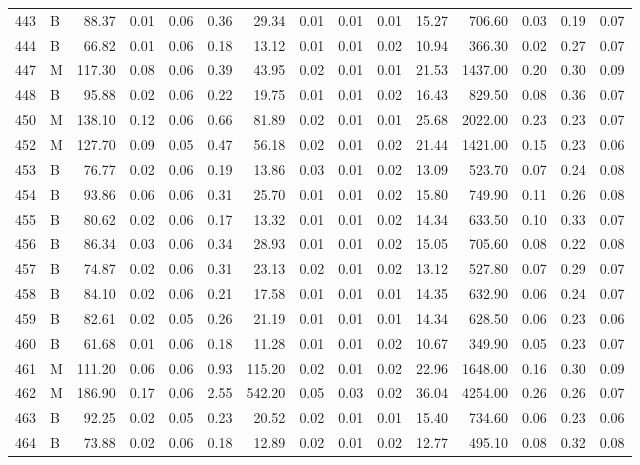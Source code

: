 \begin{table}[ht]
\begin{tabular}{rlrrrrrrrrrrrrr}
  443 & B & 88.37 & 0.01 & 0.06 & 0.36 & 29.34 & 0.01 & 0.01 & 0.01 & 15.27 & 706.60 & 0.03 & 0.19 & 0.07 \\ 
  444 & B & 66.82 & 0.01 & 0.06 & 0.18 & 13.12 & 0.01 & 0.01 & 0.02 & 10.94 & 366.30 & 0.02 & 0.27 & 0.07 \\ 
  447 & M & 117.30 & 0.08 & 0.06 & 0.39 & 43.95 & 0.02 & 0.01 & 0.01 & 21.53 & 1437.00 & 0.20 & 0.30 & 0.09 \\ 
  448 & B & 95.88 & 0.02 & 0.06 & 0.22 & 19.75 & 0.01 & 0.01 & 0.02 & 16.43 & 829.50 & 0.08 & 0.36 & 0.07 \\ 
  450 & M & 138.10 & 0.12 & 0.06 & 0.66 & 81.89 & 0.02 & 0.01 & 0.01 & 25.68 & 2022.00 & 0.23 & 0.23 & 0.07 \\ 
  452 & M & 127.70 & 0.09 & 0.05 & 0.47 & 56.18 & 0.02 & 0.01 & 0.02 & 21.44 & 1421.00 & 0.15 & 0.23 & 0.06 \\ 
  453 & B & 76.77 & 0.02 & 0.06 & 0.19 & 13.86 & 0.03 & 0.01 & 0.02 & 13.09 & 523.70 & 0.07 & 0.24 & 0.08 \\ 
  454 & B & 93.86 & 0.06 & 0.06 & 0.31 & 25.70 & 0.01 & 0.01 & 0.02 & 15.80 & 749.90 & 0.11 & 0.26 & 0.08 \\ 
  455 & B & 80.62 & 0.02 & 0.06 & 0.17 & 13.32 & 0.01 & 0.01 & 0.02 & 14.34 & 633.50 & 0.10 & 0.33 & 0.07 \\ 
  456 & B & 86.34 & 0.03 & 0.06 & 0.34 & 28.93 & 0.01 & 0.01 & 0.02 & 15.05 & 705.60 & 0.08 & 0.22 & 0.08 \\ 
  457 & B & 74.87 & 0.02 & 0.06 & 0.31 & 23.13 & 0.02 & 0.01 & 0.02 & 13.12 & 527.80 & 0.07 & 0.29 & 0.07 \\ 
  458 & B & 84.10 & 0.02 & 0.06 & 0.21 & 17.58 & 0.01 & 0.01 & 0.01 & 14.35 & 632.90 & 0.06 & 0.24 & 0.07 \\ 
  459 & B & 82.61 & 0.02 & 0.05 & 0.26 & 21.19 & 0.01 & 0.01 & 0.01 & 14.34 & 628.50 & 0.06 & 0.23 & 0.06 \\ 
  460 & B & 61.68 & 0.01 & 0.06 & 0.18 & 11.28 & 0.01 & 0.01 & 0.02 & 10.67 & 349.90 & 0.05 & 0.23 & 0.07 \\ 
  461 & M & 111.20 & 0.06 & 0.06 & 0.93 & 115.20 & 0.02 & 0.01 & 0.02 & 22.96 & 1648.00 & 0.16 & 0.30 & 0.09 \\ 
  462 & M & 186.90 & 0.17 & 0.06 & 2.55 & 542.20 & 0.05 & 0.03 & 0.02 & 36.04 & 4254.00 & 0.26 & 0.26 & 0.07 \\ 
  463 & B & 92.25 & 0.02 & 0.05 & 0.23 & 20.52 & 0.02 & 0.01 & 0.01 & 15.40 & 734.60 & 0.06 & 0.23 & 0.06 \\ 
  464 & B & 73.88 & 0.02 & 0.06 & 0.18 & 12.89 & 0.02 & 0.01 & 0.02 & 12.77 & 495.10 & 0.08 & 0.32 & 0.08 \\ 

\end{tabular}
\end{table}
